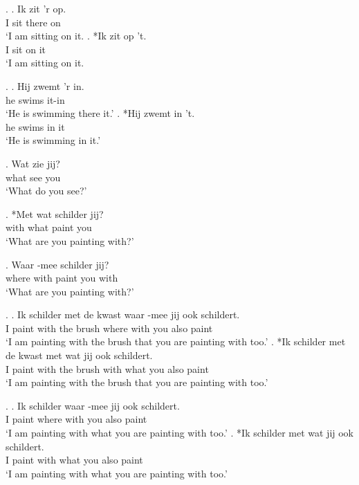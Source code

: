 \documentclass[xcolor=dvipsnames,10pt]{beamer}
\begin{document}
\begin{frame}

\ex.
\ag. Ik zit 'r op.\\
 I sit there on\\
 `I am sitting on it.
\bg. *Ik zit op 't.\\
 I sit on it\\
 `I am sitting on it.

\ex.
 \ag. Hij zwemt 'r in.\\
  he swims it-in\\
  `He is swimming there it.'
 \bg. *Hij zwemt in 't.\\
  he swims in it\\
  `He is swimming in it.'

\end{frame}



\begin{frame}

\exg. Wat zie jij?\\
 what see you\\
 `What do you see?'\label{ex:wat}

\exg. *Met wat schilder jij?\\
 with what paint you\\
 `What are you painting with?'\label{ex:metwat}

\exg. Waar -mee schilder jij?\\
 where with paint you with\\
 `What are you painting with?'\label{ex:waar-mee}

\end{frame}


\begin{frame}

\ex.\label{ex:headed}
\ag. Ik schilder met de kwast waar -mee jij ook schildert.\\
 I paint with the brush where with you also paint\\
 `I am painting with the brush that you are painting with too.'
\bg. *Ik schilder met de kwast met wat jij ook schildert.\\
 I paint with the brush with what you also paint\\
 `I am painting with the brush that you are painting with too.'

\ex.\label{ex:headless}
\ag. Ik schilder waar -mee jij ook schildert.\\
 I paint where with you also paint\\
 `I am painting with what you are painting with too.'
\bg. *Ik schilder met wat jij ook schildert.\\
 I paint with what you also paint\\
 `I am painting with what you are painting with too.'

\end{frame}
\end{document}
